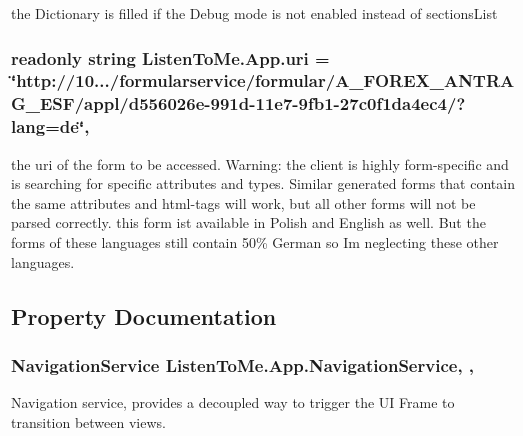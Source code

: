 the Dictionary is filled if the Debug mode is not enabled instead of sections\+List 

\subsubsection[{\texorpdfstring{uri}{uri}}]{\setlength{\rightskip}{0pt plus 5cm}readonly string Listen\+To\+Me.\+App.\+uri = \char`\"{}http\+://10.../formularservice/formular/A\+\_\+\+F\+O\+R\+E\+X\+\_\+\+A\+N\+T\+R\+A\+G\+\_\+\+E\+SF/appl/d556026e-\/991d-\/11e7-\/9fb1-\/27c0f1da4ec4/?lang=de\char`\"{}\hspace{0.3cm}{\ttfamily [static]}, {\ttfamily [package]}}\hypertarget{class_listen_to_me_1_1_app_a2c50cfed33094aff84b281be8244f41a}{}\label{class_listen_to_me_1_1_app_a2c50cfed33094aff84b281be8244f41a}


the uri of the form to be accessed. Warning\+: the client is highly form-\/specific and is searching for specific attributes and types. Similar generated forms that contain the same attributes and html-\/tags will work, but all other forms will not be parsed correctly. this form ist available in Polish and English as well. But the forms of these languages still contain 50\% German so I\textquotesingle{}m neglecting these other languages. 



\subsection{Property Documentation}
\subsubsection[{\texorpdfstring{Navigation\+Service}{NavigationService}}]{\setlength{\rightskip}{0pt plus 5cm}Navigation\+Service Listen\+To\+Me.\+App.\+Navigation\+Service\hspace{0.3cm}{\ttfamily [static]}, {\ttfamily [get]}, {}}\hypertarget{class_listen_to_me_1_1_app_ae35ddc10bf8aad1a80c92c71c6e3b7fc}{}\label{class_listen_to_me_1_1_app_ae35ddc10bf8aad1a80c92c71c6e3b7fc}


Navigation service, provides a decoupled way to trigger the UI Frame to transition between views. 

